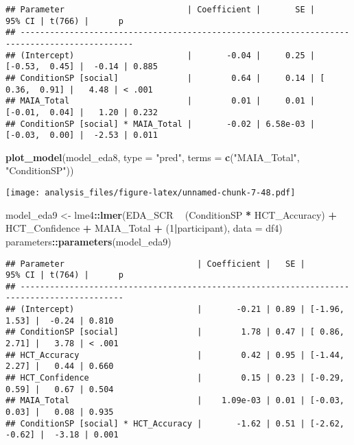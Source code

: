 \documentclass[
]{article}
\newenvironment{Shaded}{\begin{snugshade}}{\end{snugshade}}
\newcommand{\DataTypeTok}[1]{\textcolor[rgb]{0.13,0.29,0.53}{#1}}
\newcommand{\DecValTok}[1]{\textcolor[rgb]{0.00,0.00,0.81}{#1}}
\newcommand{\KeywordTok}[1]{\textcolor[rgb]{0.13,0.29,0.53}{\textbf{#1}}}
\newcommand{\NormalTok}[1]{#1}
\newcommand{\OperatorTok}[1]{\textcolor[rgb]{0.81,0.36,0.00}{\textbf{#1}}}
\newcommand{\StringTok}[1]{\textcolor[rgb]{0.31,0.60,0.02}{#1}}
\begin{document}
\begin{verbatim}
## Parameter                         | Coefficient |       SE |         95% CI | t(766) |      p
## ---------------------------------------------------------------------------------------------
## (Intercept)                       |       -0.04 |     0.25 | [-0.53,  0.45] |  -0.14 | 0.885 
## ConditionSP [social]              |        0.64 |     0.14 | [ 0.36,  0.91] |   4.48 | < .001
## MAIA_Total                        |        0.01 |     0.01 | [-0.01,  0.04] |   1.20 | 0.232 
## ConditionSP [social] * MAIA_Total |       -0.02 | 6.58e-03 | [-0.03,  0.00] |  -2.53 | 0.011
\end{verbatim}

\begin{Shaded}
\begin{Highlighting}[]
\KeywordTok{plot_model}\NormalTok{(model_eda8, }\DataTypeTok{type =} \StringTok{"pred"}\NormalTok{, }\DataTypeTok{terms =} \KeywordTok{c}\NormalTok{(}\StringTok{"MAIA_Total"}\NormalTok{, }\StringTok{"ConditionSP"}\NormalTok{))}
\end{Highlighting}
\end{Shaded}

\texttt{[image: analysis\_files/figure-latex/unnamed-chunk-7-48.pdf]}

\begin{Shaded}
\begin{Highlighting}[]
\NormalTok{model_eda9 <-}\StringTok{ }\NormalTok{lme4}\OperatorTok{::}\KeywordTok{lmer}\NormalTok{(EDA_SCR }\OperatorTok{~}\StringTok{ }\NormalTok{(ConditionSP }\OperatorTok{*}\StringTok{ }\NormalTok{HCT_Accuracy) }\OperatorTok{+}\StringTok{ }\NormalTok{HCT_Confidence }\OperatorTok{+}\StringTok{ }\NormalTok{MAIA_Total }\OperatorTok{+}\StringTok{ }\NormalTok{(}\DecValTok{1}\OperatorTok{|}\NormalTok{participant), }\DataTypeTok{data =}\NormalTok{ df4)}
\NormalTok{parameters}\OperatorTok{::}\KeywordTok{parameters}\NormalTok{(model_eda9)}
\end{Highlighting}
\end{Shaded}

\begin{verbatim}
## Parameter                           | Coefficient |   SE |         95% CI | t(764) |      p
## -------------------------------------------------------------------------------------------
## (Intercept)                         |       -0.21 | 0.89 | [-1.96,  1.53] |  -0.24 | 0.810 
## ConditionSP [social]                |        1.78 | 0.47 | [ 0.86,  2.71] |   3.78 | < .001
## HCT_Accuracy                        |        0.42 | 0.95 | [-1.44,  2.27] |   0.44 | 0.660 
## HCT_Confidence                      |        0.15 | 0.23 | [-0.29,  0.59] |   0.67 | 0.504 
## MAIA_Total                          |    1.09e-03 | 0.01 | [-0.03,  0.03] |   0.08 | 0.935 
## ConditionSP [social] * HCT_Accuracy |       -1.62 | 0.51 | [-2.62, -0.62] |  -3.18 | 0.001
\end{verbatim}
\end{document}
